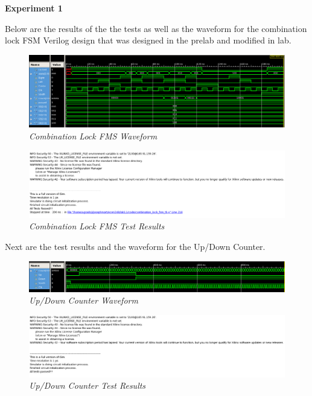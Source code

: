 \documentclass[a4paper,12pt]{article}
\begin{document}
\textbf{Experiment 1}

Below are the results of the the tests as well as the waveform for the combination lock FSM Verilog design that was designed in the prelab and modified in lab.

\begin{figure}[h]
  \begin{center}
    \includegraphics[scale=.4]{Exp1WaveForm.png}
    \caption{\textit{Combination Lock FMS Waveform}}
  \end{center}
\end{figure}

\begin{figure}[h]
  \begin{center}
    \includegraphics[scale=.5]{ExpTestResults.png}
    \caption{\textit{Combination Lock FMS Test Results}}
  \end{center}
\end{figure}

Next are the test results and the waveform for the Up/Down Counter.

\newpage

\begin{figure}[h]
  \begin{center}
    \includegraphics[scale=.4]{UpDownCountWaveForm.png}
    \caption{\textit{Up/Down Counter Waveform}}
  \end{center}
\end{figure}

\begin{figure}[h]
  \begin{center}
    \includegraphics[scale=.4]{UpDownCountTests.png}
    \caption{\textit{Up/Down Counter Test Results}}
  \end{center}
\end{figure}
\end{document}
